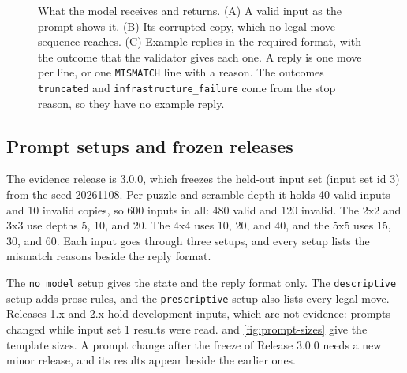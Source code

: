 \documentclass[10pt,twocolumn,letterpaper]{article}
\newcommand{\code}[1]{\texttt{#1}}
\begin{document}
\begin{figure}[t]
\begin{phcanvas}
\end{phcanvas}
\caption{What the model receives and returns. (A) A valid input as the prompt shows it. (B) Its corrupted copy, which no legal move sequence reaches. (C) Example replies in the required format, with the outcome that the validator gives each one. A reply is one move per line, or one \code{MISMATCH} line with a reason. The outcomes \code{truncated} and \code{infrastructure\_failure} come from the stop reason, so they have no example reply.}
\label{fig:example}
\end{figure}

\subsection{Prompt setups and frozen releases}\label{sec:setups}
The evidence release is 3.0.0, which freezes the held-out input set (input set id 3) from the seed 20261108. Per puzzle and scramble depth it holds 40 valid inputs and 10 invalid copies, so 600 inputs in all: 480 valid and 120 invalid. The 2x2 and 3x3 use depths 5, 10, and 20. The 4x4 uses 10, 20, and 40, and the 5x5 uses 15, 30, and 60. Each input goes through three setups, and every setup lists the mismatch reasons beside the reply format.

The \code{no\_model} setup gives the state and the reply format only. The \code{descriptive} setup adds prose rules, and the \code{prescriptive} setup also lists every legal move. Releases 1.x and 2.x hold development inputs, which are not evidence: prompts changed while input set 1 results were read.  and \cref{fig:prompt-sizes} give the template sizes. A prompt change after the freeze of Release 3.0.0 needs a new minor release, and its results appear beside the earlier ones.
\end{document}

